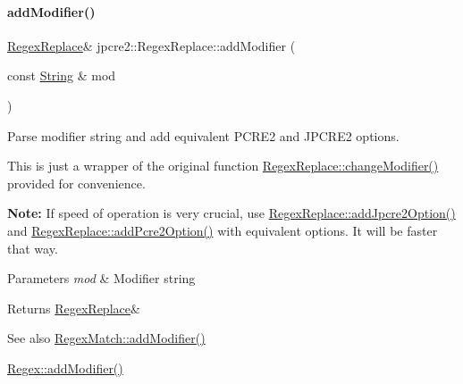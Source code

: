 \paragraph{\texorpdfstring{add\+Modifier()}{addModifier()}}
{\footnotesize\ttfamily \hyperlink{classjpcre2_1_1RegexReplace}{Regex\+Replace}\& jpcre2\+::\+Regex\+Replace\+::add\+Modifier (\begin{DoxyParamCaption}\item[{const \hyperlink{namespacejpcre2_a91f03070152fb228bc116c5a737f1d16}{String} \&}]{mod }\end{DoxyParamCaption})\hspace{0.3cm}{\ttfamily [inline]}}



Parse modifier string and add equivalent P\+C\+R\+E2 and J\+P\+C\+R\+E2 options. 

This is just a wrapper of the original function \hyperlink{classjpcre2_1_1RegexReplace_a0a2dc39fc28e6f7fe0a5d638f5891bdb_a0a2dc39fc28e6f7fe0a5d638f5891bdb}{Regex\+Replace\+::change\+Modifier()} provided for convenience.

{\bfseries Note\+:} If speed of operation is very crucial, use \hyperlink{classjpcre2_1_1RegexReplace_a3f86b1e11d08d0153a08244771e59061_a3f86b1e11d08d0153a08244771e59061}{Regex\+Replace\+::add\+Jpcre2\+Option()} and \hyperlink{classjpcre2_1_1RegexReplace_a3cfd03568b23bebcbb530a2c120b5d33_a3cfd03568b23bebcbb530a2c120b5d33}{Regex\+Replace\+::add\+Pcre2\+Option()} with equivalent options. It will be faster that way. 
\begin{DoxyParams}{Parameters}
{\em mod} & Modifier string \\
\hline
\end{DoxyParams}
\begin{DoxyReturn}{Returns}
\hyperlink{classjpcre2_1_1RegexReplace}{Regex\+Replace}\& 
\end{DoxyReturn}
\begin{DoxySeeAlso}{See also}
\hyperlink{classjpcre2_1_1RegexMatch_a08c2e481fe8b9c001e67733fb4e33972_a08c2e481fe8b9c001e67733fb4e33972}{Regex\+Match\+::add\+Modifier()} 

\hyperlink{classjpcre2_1_1Regex_ab1af1471339602446d8221b8c97c6b55_ab1af1471339602446d8221b8c97c6b55}{Regex\+::add\+Modifier()} 
\end{DoxySeeAlso}
\hypertarget{classjpcre2_1_1RegexReplace_a3cfd03568b23bebcbb530a2c120b5d33_a3cfd03568b23bebcbb530a2c120b5d33}{}\label{classjpcre2_1_1RegexReplace_a3cfd03568b23bebcbb530a2c120b5d33_a3cfd03568b23bebcbb530a2c120b5d33} 
